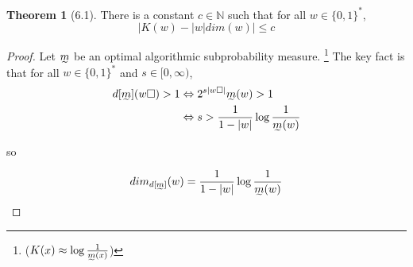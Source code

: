 \documentclass[12pt]{article}
\theoremstyle{definition}
\newtheorem*{theo}{Theorem}
\begin{document}
\begin{theo}[6.1]
    There is a constant $c \in \mathbb{N}$ such that for all $w \in \{0, 1\}^*$,
    $$|K(w) - |w| dim(w)| \le c$$
\end{theo}

\begin{proof}
    Let $\undertilde{m}$ be an optimal algorithmic subprobability measure. \footnote{($K(x) \approx \log \frac{1}{\undertilde{m}(x)}$)} The key fact is that for all $w \in \{0, 1\}^*$ and $s \in [0, \infty)$,
    $$
        \begin{aligned}
            d[\undertilde{m}](w \square) > 1 & \Leftrightarrow 2^{s|w \square|} \undertilde{m}(w) > 1               \\
                                             & \Leftrightarrow s > \frac{1}{1-|w|} \log \frac{1}{\undertilde{m}(w)} \\
        \end{aligned}
    $$

    so

    $$dim_{d[\undertilde{m}]}(w) = \frac{1}{1-|w|} \log \frac{1}{\undertilde{m}(w)}$$

\end{proof}
\end{document}
